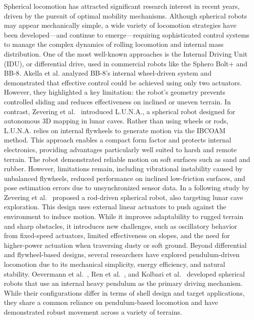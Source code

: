 \documentclass[conference]{IEEEtran}
\begin{document}
Spherical locomotion has attracted significant research interest in recent years, driven by the pursuit of optimal mobility mechanisms. 
Although spherical robots may appear mechanically simple, a wide variety of locomotion strategies have been developed—and continue to emerge—requiring sophisticated control systems to manage the complex dynamics of rolling locomotion and internal mass distribution.
One of the most well-known approaches is the Internal Driving Unit (IDU), or differential drive, used in commercial robots like the Sphero Bolt+ and BB-8. 
Akella et al.\cite{Sphero} analyzed BB-8’s internal wheel-driven system and demonstrated that effective control could be achieved using only two actuators. 
However, they highlighted a key limitation: the robot’s geometry prevents controlled sliding and reduces effectiveness on inclined or uneven terrain.
In contrast, Zevering et al.~\cite{luna} introduced L.U.N.A., a spherical robot designed for autonomous 3D mapping in lunar caves. 
Rather than using wheels or rods, L.U.N.A. relies on internal flywheels to generate motion via the IBCOAM method. 
This approach enables a compact form factor and protects internal electronics, providing advantages particularly well suited to harsh and remote terrain. 
The robot demonstrated reliable motion on soft surfaces such as sand and rubber. 
However, limitations remain, including vibrational instability caused by unbalanced flywheels, reduced performance on inclined low-friction surfaces, and pose estimation errors due to unsynchronized sensor data.
In a following study by Zevering et al.~\cite{rod_sphere} proposed a rod-driven spherical robot, also targeting lunar cave exploration. 
This design uses external linear actuators to push against the environment to induce motion. 
While it improves adaptability to rugged terrain and sharp obstacles, it introduces new challenges, such as oscillatory behavior from fixed-speed actuators, limited effectiveness on slopes, and the need for higher-power actuation when traversing dusty or soft ground.
Beyond differential and flywheel-based designs, several researchers have explored pendulum-driven locomotion due to its mechanical simplicity, energy efficiency, and natural stability. 
Oevermann et al.~\cite{roboball}, Ren et al.~\cite{novelsphere}, and  Kolbari et al.~\cite{pendulum_sphere} developed spherical robots that use an internal heavy pendulum as the primary driving mechanism. 
While their configurations differ in terms of shell design and target applications, they share a common reliance on pendulum-based locomotion and have demonstrated robust movement across a variety of terrains.
\end{document}
